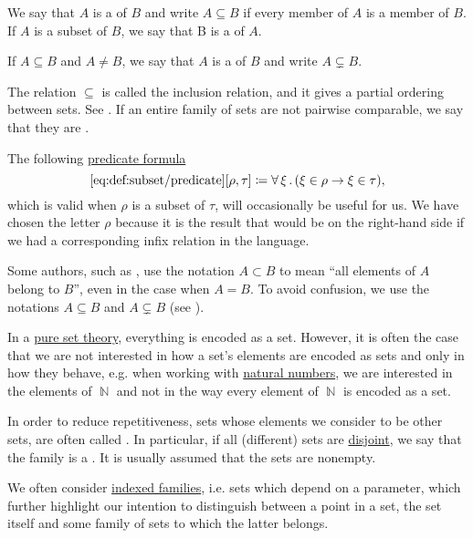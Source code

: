 \begin{definition}\label{def:subset}
  We say that \( A \) is a  of \( B \) and write \( A \subseteq B \) if every member of \( A \) is a member of \( B \). If \( A \) is a subset of \( B \), we say that B is a  of \( A \).

  If \( A \subseteq B \) and \( A \neq B \), we say that \( A \) is a  of \( B \) and write \( A \subsetneq B \).

  The relation \( \subseteq \) is called the inclusion relation, and it gives a partial ordering between sets. See . If an entire family of sets are not pairwise comparable, we say that they are .

  The following \hyperref[rem:predicate_formula]{predicate formula}
  \begin{equation*}\taglabel[\op{IsSubset}]{eq:def:subset/predicate}
    \ref{eq:def:subset/predicate}[\rho, \tau] \coloneqq \qforall \xi (\xi \in \rho \rightarrow \xi \in \tau),
  \end{equation*}
  which is valid when \( \rho \) is a subset of \( \tau \), will occasionally be useful for us. We have chosen the letter \( \rho \) because it is the result that would be on the right-hand side if we had a corresponding infix relation in the language.
\end{definition}

\begin{remark}\label{rem:subset_notation}
  Some authors, such as \cite{Kelley1955}, use the notation \( A \subset B \) to mean \enquote{all elements of \( A \) belong to \( B \)}, even in the case when \( A = B \). To avoid confusion, we use the notations \( A \subseteq B \) and \( A \subsetneq B \) (see ).
\end{remark}

\begin{remark}\label{rem:family_of_sets}
  In a \hyperref[rem:pure_set_theory]{pure set theory}, everything is encoded as a set. However, it is often the case that we are not interested in how a set's elements are encoded as sets and only in how they behave, e.g. when working with \hyperref[def:set_of_natural_numbers]{natural numbers}, we are interested in the elements of \( \BbbN \) and not in the way every element of \( \BbbN \) is encoded as a set.

  In order to reduce repetitiveness, sets whose elements we consider to be other sets, are often called . In particular, if all (different) sets are \hyperref[def:subset]{disjoint}, we say that the family is a . It is usually assumed that the sets are nonempty.

  We often consider \hyperref[def:cartesian_product/indexed_family]{indexed families}, i.e. sets which depend on a parameter, which further highlight our intention to distinguish between a point in a set, the set itself and some family of sets to which the latter belongs.
\end{remark}

